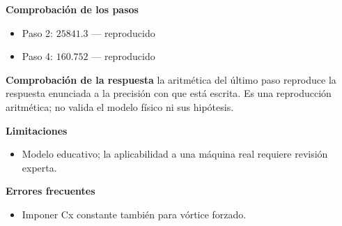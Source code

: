 \documentclass[10pt,openany]{book}
\begin{document}
\begin{tcolorbox}[title={Problema resuelto 4}, studiumworked, breakable]
\noindent\textbf{Comprobación de los pasos}
\begin{itemize}
\item Paso 2: $25841.3$ — reproducido
\item Paso 4: $160.752$ — reproducido
\end{itemize}

\noindent\textbf{Comprobación de la respuesta} la aritmética del último paso reproduce la respuesta enunciada a la precisión con que está escrita. Es una reproducción aritmética; no valida el modelo físico ni sus hipótesis.

\noindent\textbf{Limitaciones}
\begin{itemize}
\item Modelo educativo; la aplicabilidad a una máquina real requiere revisión experta.
\end{itemize}

\noindent\textbf{Errores frecuentes}
\begin{itemize}
\item Imponer Cx constante también para vórtice forzado.
\end{itemize}
\end{tcolorbox}
\end{document}
